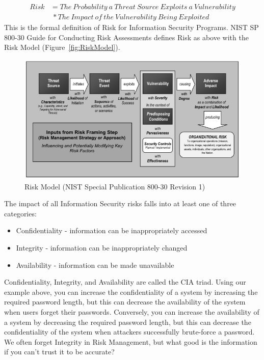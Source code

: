 \begin{align}
Risk &= The\ Probability\ a\ Threat\ Source\ Exploits\ a\ Vulnerability \nonumber \\ &\ * The\ Impact\ of\ the\ Vulnerability\ Being\ Exploited
\end{align}
This is the formal definition of Risk for Information Security Programs. NIST SP 800-30 Guide for Conducting Risk Assessments defines Risk as above with the Risk Model (Figure~\ref{fig:RiskModel}).
\begin{figure}[ht]
\centering\includegraphics[scale=.55]{./img/RiskModel}
\caption{Risk Model (NIST Special Publication 800-30 Revision 1)}
\end{figure}\label{fig:RiskModel}
The impact of all Information Security risks falls into at least one of three categories:
\begin{itemize}
\item Confidentiality - information can be inappropriately accessed
\item Integrity - information can be inappropriately changed  
\item Availability - information can be made unavailable
\end{itemize}
Confidentiality, Integrity, and Availability are called the CIA triad. Using our example above, you can increase the confidentiality of a system by increasing the required password length, but this can decrease the availability of the system when users forget their passwords. Conversely, you can increase the availability of a system by decreasing the required password length, but this can decrease the confidentiality of the system when attackers successfully brute-force a password. We often forget Integrity in Risk Management, but what good is the information if you can’t trust it to be accurate?\\\\
